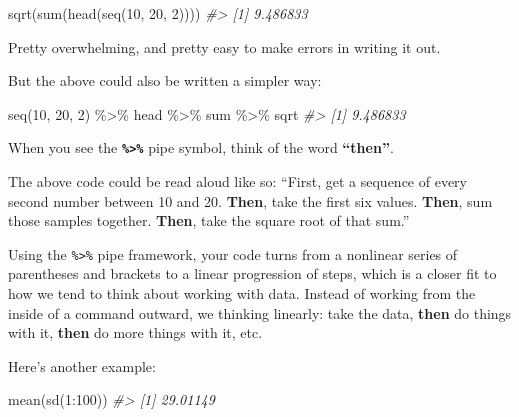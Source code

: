 \documentclass[
]{book}
\newenvironment{Shaded}{\begin{snugshade}}{\end{snugshade}}
\newcommand{\CommentTok}[1]{\textcolor[rgb]{0.56,0.35,0.01}{\textit{#1}}}
\newcommand{\DecValTok}[1]{\textcolor[rgb]{0.00,0.00,0.81}{#1}}
\newcommand{\FunctionTok}[1]{\textcolor[rgb]{0.00,0.00,0.00}{#1}}
\newcommand{\NormalTok}[1]{#1}
\newcommand{\SpecialCharTok}[1]{\textcolor[rgb]{0.00,0.00,0.00}{#1}}
\begin{document}
\begin{Shaded}
\begin{Highlighting}[]
\FunctionTok{sqrt}\NormalTok{(}\FunctionTok{sum}\NormalTok{(}\FunctionTok{head}\NormalTok{(}\FunctionTok{seq}\NormalTok{(}\DecValTok{10}\NormalTok{, }\DecValTok{20}\NormalTok{, }\DecValTok{2}\NormalTok{))))}
\CommentTok{\#\textgreater{} [1] 9.486833}
\end{Highlighting}
\end{Shaded}

Pretty overwhelming, and pretty easy to make errors in writing it out.

But the above could also be written a simpler way:

\begin{Shaded}
\begin{Highlighting}[]
\FunctionTok{seq}\NormalTok{(}\DecValTok{10}\NormalTok{, }\DecValTok{20}\NormalTok{, }\DecValTok{2}\NormalTok{) }\SpecialCharTok{\%\textgreater{}\%}\NormalTok{ head }\SpecialCharTok{\%\textgreater{}\%}\NormalTok{ sum }\SpecialCharTok{\%\textgreater{}\%}\NormalTok{ sqrt}
\CommentTok{\#\textgreater{} [1] 9.486833}
\end{Highlighting}
\end{Shaded}

When you see the \textbf{\texttt{\%\textgreater{}\%}} pipe symbol, think of the word \textbf{``then''}.

The above code could be read aloud like so: ``First, get a sequence of every second number between 10 and 20. \textbf{Then}, take the first six values. \textbf{Then}, sum those samples together. \textbf{Then}, take the square root of that sum.''

Using the \texttt{\%\textgreater{}\%} pipe framework, your code turns from a nonlinear series of parentheses and brackets to a linear progression of steps, which is a closer fit to how we tend to think about working with data. Instead of working from the inside of a command outward, we thinking linearly: take the data, \textbf{then} do things with it, \textbf{then} do more things with it, etc.

Here's another example:

\begin{Shaded}
\begin{Highlighting}[]
\FunctionTok{mean}\NormalTok{(}\FunctionTok{sd}\NormalTok{(}\DecValTok{1}\SpecialCharTok{:}\DecValTok{100}\NormalTok{))}
\CommentTok{\#\textgreater{} [1] 29.01149}
\end{Highlighting}
\end{Shaded}
\end{document}

